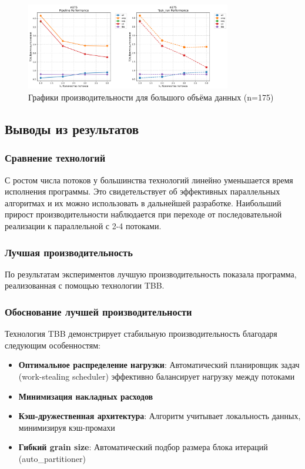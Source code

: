 \documentclass[14pt,a4paper]{article}
\begin{document}
\begin{figure}[H]
\centering
\includegraphics[width=0.8\textwidth]{ppc_tests/graphics/performance_n175.png}
\caption{Графики производительности для большого объёма данных (n=175)}
\label{fig:large}
\end{figure}


\subsection{Выводы из результатов}
\subsubsection{Сравнение технологий}
С ростом числа потоков у большинства технологий линейно уменьшается время исполнения программы. Это свидетельствует об эффективных параллельных алгоритмах и их можно использовать в дальнейшей разработке. Наибольший прирост производительности наблюдается при переходе от последовательной реализации к параллельной с 2-4 потоками.

\subsubsection{Лучшая производительность}
По результатам экспериментов лучшую производительность показала программа, реализованная с помощью технологии TBB.

\subsubsection{Обоснование лучшей производительности}
Технология TBB демонстрирует стабильную производительность благодаря следующим особенностям:
\begin{itemize}
\item \textbf{Оптимальное распределение нагрузки}: Автоматический планировщик задач (work-stealing scheduler) эффективно балансирует нагрузку между потоками
\item \textbf{Минимизация накладных расходов}
\item \textbf{Кэш-дружественная архитектура}: Алгоритм учитывает локальность данных, минимизируя кэш-промахи
\item \textbf{Гибкий grain size}: Автоматический подбор размера блока итераций (auto\_partitioner)
\end{itemize}
\newpage
\end{document}

